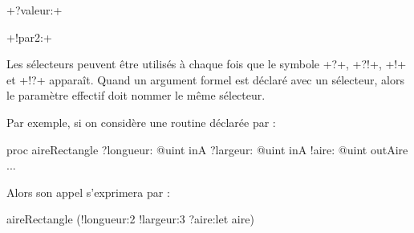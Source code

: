 \ggs+?valeur:+

\ggs+!par2:+

Les sélecteurs peuvent être utilisés à chaque fois que le symbole \ggs+?+, \ggs+?!+, \ggs+!+ et \ggs+!?+ apparaît. Quand un argument formel est déclaré avec un sélecteur, alors le paramètre effectif doit nommer le même sélecteur.

Par exemple, si on considère une routine déclarée par :

\begin{galgas}
proc aireRectangle
  ?longueur: @uint inA
  ?largeur: @uint inA
  !aire: @uint outAire 
{
  ...
}
\end{galgas}

Alors son appel s'exprimera par :
\begin{galgas}
  aireRectangle (!longueur:2 !largeur:3 ?aire:let aire) 
\end{galgas}


